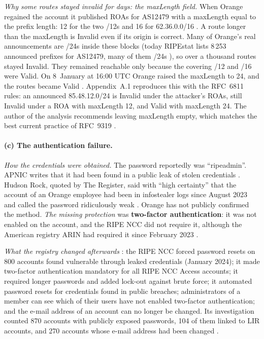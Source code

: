 \documentclass[11pt,a4paper]{article}
\begin{document}
\emph{Why some routes stayed invalid for days: the maxLength field.} When Orange regained the account it published ROAs for AS12479
with a maxLength equal to the prefix length: 12 for the two /12s and 16 for 62.36.0.0/16 \cite{apnic}. A route longer than the maxLength is
Invalid even if its origin is correct. Many of Orange's real announcements are /24s inside these blocks (today RIPEstat lists 8\,253 announced prefixes for AS12479, many of them /24s \cite{ripestat}), so over a thousand routes stayed Invalid. They remained reachable only because the covering /12
and /16 were Valid. On 8~January at 16:00 UTC Orange raised the maxLength to 24, and the routes became Valid \cite{apnic}.
Appendix~A.1 reproduces this with the RFC~6811 rules: an announced 85.48.12.0/24 is Invalid under the attacker's ROAs, still
Invalid under a ROA with maxLength 12, and Valid with maxLength 24. The author of the analysis recommends leaving maxLength empty, which
matches the best current practice of RFC~9319 \cite{apnic,rfc9319}.

\paragraph{(c) The authentication failure.} \emph{How the credentials were obtained.} The password reportedly was ``ripeadmin''. APNIC writes
that it had been found in a public leak of stolen credentials \cite{apnic}. Hudson Rock, quoted by The Register, said with ``high certainty'' that
the account of an Orange employee had been in infostealer logs since August 2023 and called the password ridiculously weak \cite{register}.
Orange has not publicly confirmed the method. \emph{The missing protection} was \textbf{two-factor authentication}: it was not enabled on the
account, and the RIPE NCC did not require it, although the American registry ARIN had required it since February 2023 \cite{register}.

\emph{What the registry changed afterwards} \cite{ripeupdate,ripereport}: the RIPE NCC forced password resets on 800 accounts found vulnerable
through leaked credentials (January 2024); it made two-factor authentication mandatory for all RIPE NCC Access accounts; it required longer
passwords and added lock-out against brute force; it automated password resets for credentials found in public breaches; administrators of a
member can see which of their users have not enabled two-factor authentication; and the e-mail address of an account can no longer be changed. Its
investigation counted 870 accounts with publicly exposed passwords, 104 of them linked to LIR accounts, and 270 accounts whose e-mail
address had been changed \cite{ripereport}.
\end{document}
